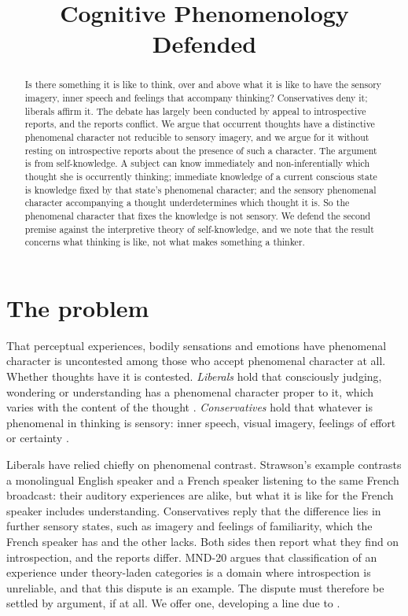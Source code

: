 \documentclass{situationist-preprint}
\title{Cognitive Phenomenology Defended}
\begin{document}
\maketitle

\begin{abstract}
Is there something it is like to think, over and above what it is like to have the sensory imagery, inner speech and feelings that accompany thinking? Conservatives deny it; liberals affirm it. The debate has largely been conducted by appeal to introspective reports, and the reports conflict. We argue that occurrent thoughts have a distinctive phenomenal character not reducible to sensory imagery, and we argue for it without resting on introspective reports about the presence of such a character. The argument is from self-knowledge. A subject can know immediately and non-inferentially which thought she is occurrently thinking; immediate knowledge of a current conscious state is knowledge fixed by that state's phenomenal character; and the sensory phenomenal character accompanying a thought underdetermines which thought it is. So the phenomenal character that fixes the knowledge is not sensory. We defend the second premise against the interpretive theory of self-knowledge, and we note that the result concerns what thinking is like, not what makes something a thinker.
\end{abstract}

\section{The problem}

That perceptual experiences, bodily sensations and emotions have phenomenal character is uncontested among those who accept phenomenal character at all. Whether thoughts have it is contested. \emph{Liberals} hold that consciously judging, wondering or understanding has a phenomenal character proper to it, which varies with the content of the thought \citep{Strawson1994,Siewert1998,HorganTienson2002,Pitt2004}. \emph{Conservatives} hold that whatever is phenomenal in thinking is sensory: inner speech, visual imagery, feelings of effort or certainty \citep{Prinz2011,TyeWright2011,CarruthersVeillet2011}.

Liberals have relied chiefly on phenomenal contrast. Strawson's example contrasts a monolingual English speaker and a French speaker listening to the same French broadcast: their auditory experiences are alike, but what it is like for the French speaker includes understanding. Conservatives reply that the difference lies in further sensory states, such as imagery and feelings of familiarity, which the French speaker has and the other lacks. Both sides then report what they find on introspection, and the reports differ. MND-20 argues that classification of an experience under theory-laden categories is a domain where introspection is unreliable, and that this dispute is an example. The dispute must therefore be settled by argument, if at all. We offer one, developing a line due to \citet{Pitt2004}.
\end{document}
